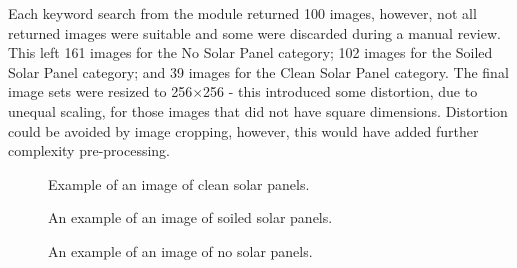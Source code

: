 \documentclass[10pt,journal,compsoc]{IEEEtran}
\begin{document}
		Each keyword search from the module returned 100 images, however, not all returned images were suitable and some were discarded during a manual review. This left 161 images for the No Solar Panel category; 102 images for the Soiled Solar Panel category; and 39 images for the Clean Solar Panel category. The final image sets were resized to 256$\times$256 - this introduced some distortion, due to unequal scaling, for those images that did not have square dimensions. Distortion could be avoided by image cropping, however, this would have added further complexity pre-processing.
		\begin{figure}[h]
			\centering
			\caption{Example of an image of clean solar panels.}
		\end{figure}
		
		\begin{figure}[h]
			\centering
			\caption{An example of an image of soiled solar panels.}
		\end{figure}
		
		\begin{figure}[h]
			\centering
			\caption{An example of an image of no solar panels.}
		\end{figure}
		
\end{document}
